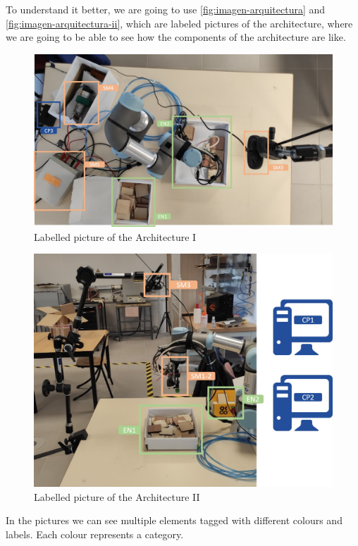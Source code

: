 		To understand it better, we are going to use \autoref{fig:imagen-arquitectura} and \autoref{fig:imagen-arquitectura-ii}, which are labeled pictures of the architecture, where we are going to be able to see how the components of the architecture are like. 
		
		\begin{figure}[H]
			\centering
			\includegraphics[width=0.9\linewidth]{"Images/Imagen Arquitectura"}
			\caption[Picture of Architecture I]{Labelled picture of the Architecture I}
			\label{fig:imagen-arquitectura}
		\end{figure}
	
		
		\begin{figure}[H]
			\centering
			\includegraphics[width=0.9\linewidth]{"Images/Imagen Arquitectura II"}
			\caption[Picture of Architecture II]{Labelled picture of the Architecture II}
			\label{fig:imagen-arquitectura-ii}
		\end{figure}
	
		In the pictures we can see multiple elements tagged with different colours and labels. Each colour represents a category. 
		
